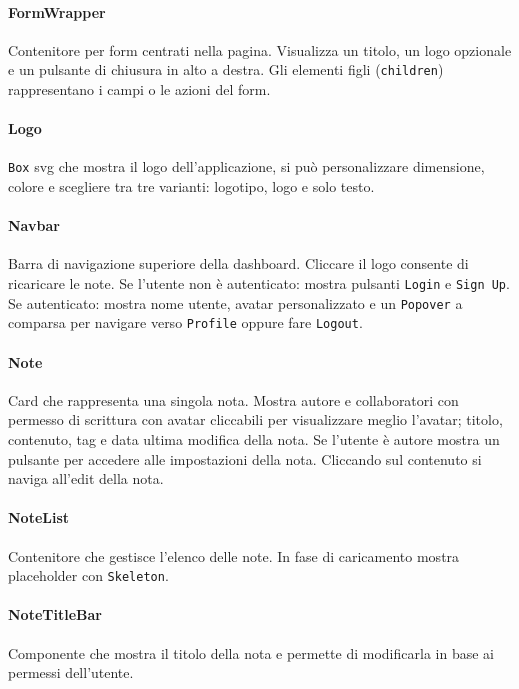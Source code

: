 \documentclass[11pt]{article}
\begin{document}
\paragraph{FormWrapper}  
Contenitore per form centrati nella pagina.  
Visualizza un titolo, un logo opzionale e un pulsante di chiusura in alto a destra.  
Gli elementi figli (\texttt{children}) rappresentano i campi o le azioni del form.

\paragraph{Logo}  
\texttt{Box} svg che mostra il logo dell’applicazione, si può personalizzare dimensione, colore e scegliere tra tre varianti: logotipo, logo e solo testo.

\paragraph{Navbar}  
Barra di navigazione superiore della dashboard. Cliccare il logo consente di ricaricare le note. Se l’utente non è autenticato: mostra pulsanti \texttt{Login} e \texttt{Sign Up}.  
Se autenticato: mostra nome utente, avatar personalizzato e un \texttt{Popover} a comparsa per navigare verso \texttt{Profile} oppure fare \texttt{Logout}.

\paragraph{Note}  
Card che rappresenta una singola nota. Mostra autore e collaboratori con permesso di scrittura con avatar cliccabili per visualizzare meglio l'avatar; titolo, contenuto, tag e data ultima modifica della nota. Se l’utente è autore mostra un pulsante per accedere alle impostazioni della nota.  
Cliccando sul contenuto si naviga all'edit della nota.

\paragraph{NoteList}  
Contenitore che gestisce l’elenco delle note. In fase di caricamento mostra placeholder con \texttt{Skeleton}.

\paragraph{NoteTitleBar}  
Componente che mostra il titolo della nota e permette di modificarla in base ai permessi dell'utente.  
\end{document}
